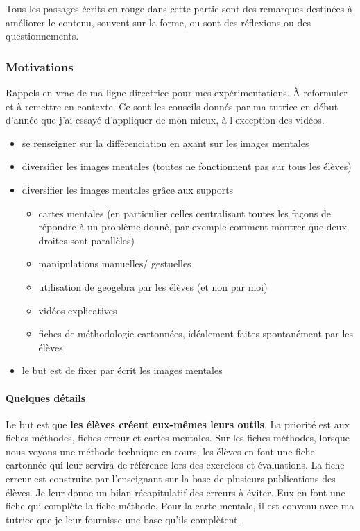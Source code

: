 {\color{red}Tous les passages écrits en rouge dans cette partie sont des remarques destinées à améliorer le contenu, souvent sur la forme, ou sont des réflexions ou des questionnements.}

\subsubsection{Motivations}

{\color{red}Rappels en vrac de ma ligne directrice pour mes expérimentations. À reformuler et à remettre en contexte. Ce sont les conseils donnés par ma tutrice en début d'année que j'ai essayé d'appliquer de mon mieux, à l'exception des vidéos.}

\begin{itemize}
\item se renseigner sur la différenciation en axant sur les images mentales
\item diversifier les images mentales (toutes ne fonctionnent pas sur tous les élèves)
\item diversifier les images mentales grâce aux supports
\begin{itemize}
\item cartes mentales (en particulier celles centralisant toutes les façons de répondre à un problème donné, par exemple comment montrer que deux droites sont parallèles)
\item manipulations manuelles/ gestuelles
\item utilisation de geogebra par les élèves (et non par moi)
\item vidéos explicatives
\item fiches de méthodologie cartonnées, idéalement faites spontanément par les élèves
\end{itemize}
\item le but est de fixer par écrit les images mentales
\end{itemize}

\paragraph{Quelques détails}

Le but est que \textbf{les élèves créent eux-mêmes leurs outils}. La priorité est aux fiches méthodes, fiches erreur et cartes mentales. Sur les fiches méthodes, lorsque nous voyons une méthode technique en cours, les élèves en font une fiche cartonnée qui leur servira de référence lors des exercices et évaluations. La fiche erreur est construite par l'enseignant sur la base de plusieurs publications des élèves. Je leur donne un bilan récapitulatif des erreurs à éviter. Eux en font une fiche qui complète la fiche méthode. Pour la carte mentale, il est convenu avec ma tutrice que je leur fournisse une base qu'ils complètent. 

